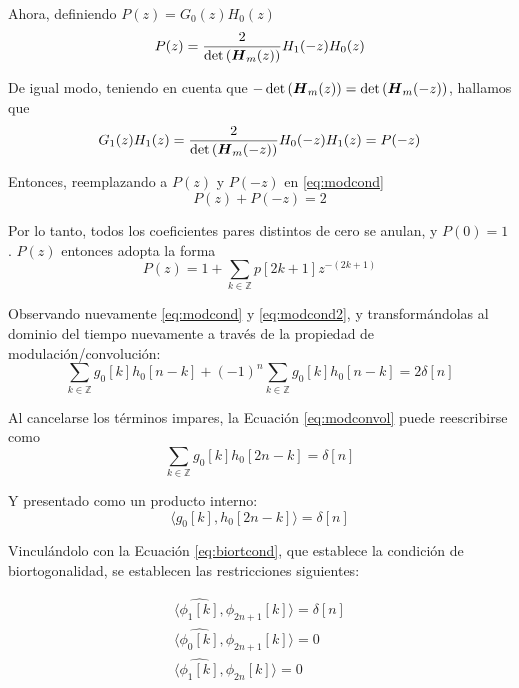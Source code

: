 	Ahora, definiendo $P(z)=G_0(z)H_0(z)$
		\begin{equation}
			P(z)=\frac{2}{\det{(\boldsymbol{H}_m(z))}}H_1(-z)H_0(z)
		\end{equation}

	De igual modo, teniendo en cuenta que $-\det{(\boldsymbol{H}_m(z))}=\det{(\boldsymbol{H}_m(-z))}$, hallamos que
		\begin{equation}
			G_1(z)H_1(z)=\frac{2}{\det{(\boldsymbol{H}_m(-z))}}H_0(-z)H_1(z)=P(-z)
		\end{equation}

	Entonces, reemplazando a $P(z)$ y $P(-z)$ en  \eqref{eq:modcond}
		\begin{equation}
			P(z)+P(-z)=2
		\end{equation}
	
	Por lo tanto, todos los coeficientes pares distintos de cero se anulan, y $P(0)=1$. $P(z)$ entonces adopta la forma
		\begin{equation}
			P(z)=1+\sum_{k\in\mathbb{Z}} p[2k+1]z^{-(2k+1)}
		\end{equation}
	
	Observando nuevamente \eqref{eq:modcond} y \eqref{eq:modcond2}, y transformándolas al dominio del tiempo nuevamente a través de la propiedad de modulación/convolución: 
		\begin{equation}
			\sum_{k\in\mathbb{Z}}g_0[k]h_0[n-k]+(-1)^n\sum_{k\in\mathbb{Z}}g_0[k]h_0[n-k]=2\delta[n]
			\label{eq:modconvol}
		\end{equation}

	Al cancelarse los términos impares, la Ecuación \eqref{eq:modconvol} puede reescribirse como
		\begin{equation}
			\sum_{k\in\mathbb{Z}}g_0[k]h_0[2n-k]=\delta[n]
		\end{equation}

	Y presentado como un producto interno:
		\begin{equation}
			\langle g_0[k],h_0[2n-k] \rangle=\delta[n]
		\end{equation}

	Vinculándolo con la Ecuación \eqref{eq:biortcond}, que establece la condición de biortogonalidad, se establecen las restricciones siguientes:

	\begin{align}
		\langle \hat{\phi_1[k]},\phi_{2n+1}[k] \rangle = \delta[n]	\\
		\langle \hat{\phi_0[k]},\phi_{2n+1}[k]\rangle	= 0	\\
		\langle \hat{\phi_1[k]},\phi_{2n}[k]\rangle = 0
	\end{align}

